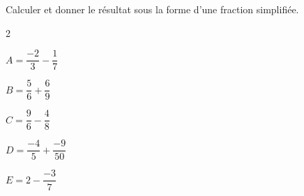 \begin{exercice*}
    Calculer et donner le résultat sous la forme d'une fraction simplifiée.
    \begin{multicols}2
        \begin{list}{}{}
            \begin{spacing}{2}
                \item $A = \dfrac{-2}{3}-\dfrac{1}{7}$
                \item $B = \dfrac{5}{6}+\dfrac{6}{9}$
                \item $C = \dfrac{9}{6}-\dfrac{4}{8}$
                \item $D = \dfrac{-4}{5}+\dfrac{-9}{50}$
                \item $E = 2-\dfrac{-3}{7}$
            \end{spacing}
        \end{list}
    \end{multicols}
\end{exercice*}

